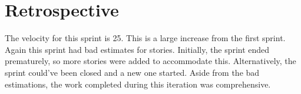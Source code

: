 \section{Retrospective}
The velocity for this sprint is 25. This is a large increase from the first sprint. Again this sprint had bad estimates for stories. Initially, the sprint ended prematurely, so more stories were added to accommodate this. Alternatively, the sprint could've been closed and a new one started. Aside from the bad estimations, the work completed during this iteration was comprehensive.
